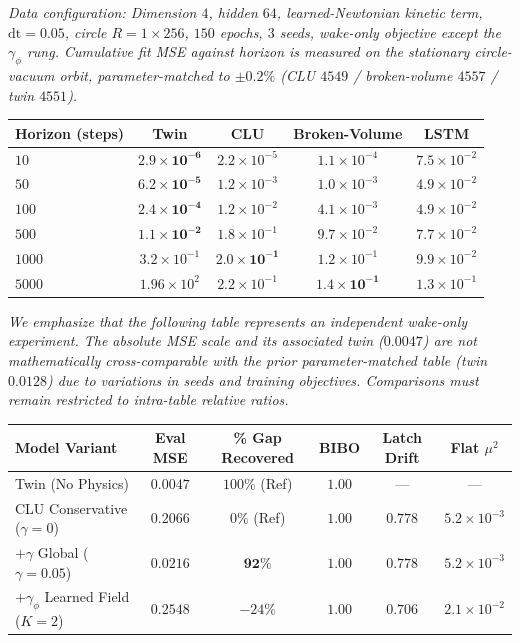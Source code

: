 \documentclass{article}
\begin{document}
\emph{Data configuration: Dimension $4$, hidden $64$, learned-Newtonian kinetic term, $\mathrm{dt}=0.05$, circle $R=1\times256$, $150$ epochs, $3$ seeds, wake-only objective except the $\gamma_\phi$ rung. Cumulative fit MSE against horizon is measured on the stationary circle-vacuum orbit, parameter-matched to $\pm0.2\%$ (CLU $4549$ / broken-volume $4557$ / twin $4551$).}

\begin{center}
\begin{tabular}{lcccc}
\toprule
Horizon (steps) & \textbf{Twin} & \textbf{CLU} & Broken-Volume & LSTM \\
\midrule
$10$ & $\mathbf{2.9{\times}10^{-6}}$ & $2.2{\times}10^{-5}$ & $1.1{\times}10^{-4}$ & $7.5{\times}10^{-2}$ \\
$50$ & $\mathbf{6.2{\times}10^{-5}}$ & $1.2{\times}10^{-3}$ & $1.0{\times}10^{-3}$ & $4.9{\times}10^{-2}$ \\
$100$ & $\mathbf{2.4{\times}10^{-4}}$ & $1.2{\times}10^{-2}$ & $4.1{\times}10^{-3}$ & $4.9{\times}10^{-2}$ \\
$500$ & $\mathbf{1.1{\times}10^{-2}}$ & $1.8{\times}10^{-1}$ & $9.7{\times}10^{-2}$ & $7.7{\times}10^{-2}$ \\
$1000$ & $3.2{\times}10^{-1}$ & $\mathbf{2.0{\times}10^{-1}}$ & $1.2{\times}10^{-1}$ & $9.9{\times}10^{-2}$ \\
$5000$ & $1.96{\times}10^{2}$ & $2.2{\times}10^{-1}$ & $\mathbf{1.4{\times}10^{-1}}$ & $1.3{\times}10^{-1}$ \\
\bottomrule
\end{tabular}
\end{center}

\emph{We emphasize that the following table represents an independent wake-only experiment. The absolute MSE scale and its associated twin ($0.0047$) are not mathematically cross-comparable with the prior parameter-matched table (twin $0.0128$) due to variations in seeds and training objectives. Comparisons must remain restricted to intra-table relative ratios.}

\begin{center}
\begin{tabular}{lccccc}
\toprule
Model Variant & Eval MSE & \% Gap Recovered & BIBO & Latch Drift & Flat $\mu^2$ \\
\midrule
Twin (No Physics) & $0.0047$ & $100\%$ (Ref) & $1.00$ & --- & --- \\
CLU Conservative ($\gamma=0$) & $0.2066$ & $0\%$ (Ref) & $1.00$ & $0.778$ & $5.2{\times}10^{-3}$ \\
$+\gamma$ Global ($\gamma=0.05$) & $0.0216$ & $\mathbf{92\%}$ & $1.00$ & $0.778$ & $5.2{\times}10^{-3}$ \\
$+\gamma_\phi$ Learned Field ($K=2$) & $0.2548$ & $-24\%$ & $1.00$ & $0.706$ & $2.1{\times}10^{-2}$ \\
\bottomrule
\end{tabular}
\end{center}
\end{document}
